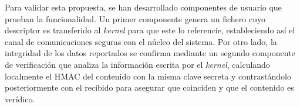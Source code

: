 Para validar esta propuesta, se han desarrollado componentes de usuario que prueban la funcionalidad. Un primer componente genera un fichero cuyo descriptor es transferido al \textit{kernel} para que este lo referencie, estableciendo así el canal de comunicaciones seguras con el núcleo del sistema.
Por otro lado, la integridad de los datos reportados se confirma mediante un segundo componente de verificación que analiza la información escrita por el \textit{kernel}, calculando localmente el HMAC del contenido con la misma clave secreta y
contrastándolo posteriormente con el recibido para asegurar que coinciden y que el contenido es verídico.\\